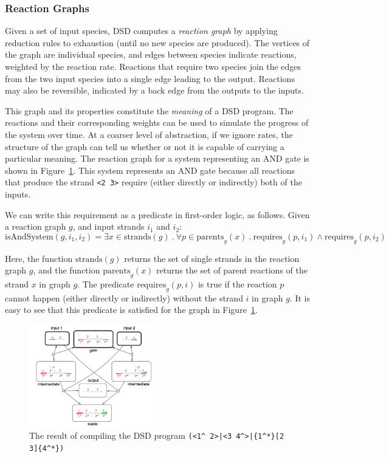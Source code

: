 \documentclass{article}
\begin{document}
\subsubsection{Reaction Graphs}

Given a set of input species, DSD computes a \emph{reaction graph} by applying
reduction rules to exhaustion (until no new species are produced). The vertices
of the graph are individual species, and edges between species indicate
reactions, weighted by the reaction rate. Reactions that require two species
join the edges from the two input species into a single edge leading to the
output. Reactions may also be reversible, indicated by a back edge from the
outputs to the inputs.

This graph
and its properties constitute the \emph{meaning} of a DSD program.
The reactions and their corresponding weights can be used to simulate
the progress of the system over time. At a coarser level of abstraction,
if we ignore rates, the structure of the graph can tell us whether or not
it is capable of carrying a particular meaning. The reaction
graph for a system representing an AND gate is shown in
Figure~\ref{figure:and-gate}. This system represents an AND gate
because all reactions that produce the strand \verb;<2 3>;
require (either directly or indirectly) both of the inputs.

We can write this requirement as a predicate in first-order logic, as
follows. Given a reaction graph $g$, and input strands $i_1$ and $i_2$:
\begin{equation}
\mathrm{isAndSystem}(g, i_1, i_2) =
\exists x \in \mathrm{strands}(g)\ .\ 
\forall p \in \mathrm{parents}_g(x)\ .\ 
\mathrm{requires}_g(p, i_1) \land \mathrm{requires}_g(p, i_2)
\label{eq:and-sys}
\end{equation}

Here, the function $\mathrm{strands}(g)$ returns the set of single strands in
the reaction graph $g$, and the function $\mathrm{parents}_g(x)$ returns
the set of parent reactions of the strand $x$ in graph $g$. The predicate 
$\mathrm{requires}_g(p,i)$ is true if the reaction $p$ cannot happen
(either directly or indirectly) without the strand $i$ in graph $g$.
It is easy to see that this predicate is satisfied for the graph in
Figure~\ref{figure:and-gate}.

\begin{figure}
\centering
\includegraphics[width=0.5\textwidth]{figures/and-gate.png}
\caption{
The result of compiling the DSD program
\texttt{(<1\^{} 2>|<3 4\^{}>|\{1\^{}*\}[2 3]\{4\^{}*\})}
}
\label{figure:and-gate}
\end{figure}
\end{document}
